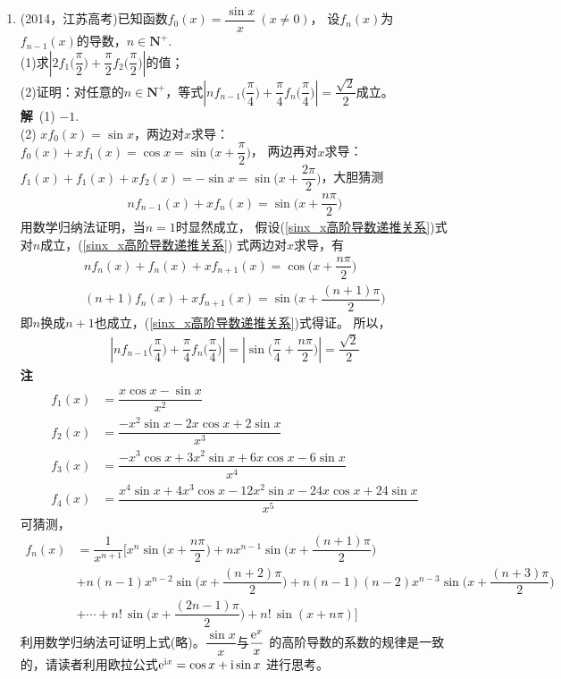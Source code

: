 \begin{enumerate}[label={【\textbf{例\thechapter.\arabic*}】},
 leftmargin=\inteval{\myenumleftmargin}pt,
 itemsep=\inteval{\myenumitempsep}pt,
 itemindent=\inteval{\myenumitemindent}pt]
\item (2014，江苏高考)已知函数$f_{0}(x)=\dfrac{\sin x}{x}\ (x\neq 0)$，
设$f_{n}(x)$为$f_{n-1}(x)$的导数，$n\in \textbf{N}^{+}$. \\
(1)求$ \left|2f_{1}\Big(\dfrac{\pi}{2}\Big)+
\dfrac{\pi}{2}f_{2}\Big(\dfrac{\pi}{2}\Big)\right| $的值；\\
(2)证明：对任意的$n\in \textbf{N}^{+}$，等式$\left|nf_{n-1}
\Big(\dfrac{\pi}{4}\Big)+\dfrac{\pi}{4}f_{n}
\Big(\dfrac{\pi}{4}\Big)\right|=\dfrac{\sqrt{2}}{2}$成立。\\
\textbf{解}\ (1) $ -1 $. \\
(2) $ xf_0(x)=\sin x $，两边对$ x $求导：$ f_0(x)+xf_1(x)=\cos x=
\sin\Big(x+\dfrac{\pi}{2}\Big) $，
两边再对$ x $求导：$ f_1(x)+f_1(x)+xf_2(x)=-\sin x=
\sin\Big(x+\dfrac{2\pi}{2}\Big) $，大胆猜测
\begin{gather}\label{sinx_x高阶导数递推关系}
    nf_{n-1}(x)+xf_{n}(x)=\sin\Big(x+\dfrac{n\pi}{2}\Big)
\end{gather}
用数学归纳法证明，当$ n=1 $时显然成立，
假设(\ref{sinx_x高阶导数递推关系})式对$ n $成立，(\ref{sinx_x高阶导数递推关系})
式两边对$ x $求导，有
\begin{gather*}
    nf_{n}(x)+f_n(x)+xf_{n+1}(x)=\cos\Big(x+\dfrac{n\pi}{2}\Big) \\
    (n+1)f_n(x)+xf_{n+1}(x)=\sin\Big(x+\dfrac{(n+1)\pi}{2}\Big)
\end{gather*}
即$ n $换成$ n+1 $也成立，(\ref{sinx_x高阶导数递推关系})式得证。
所以，
\begin{gather*}
    \left|nf_{n-1}\Big(\dfrac{\pi}{4}\Big)+\dfrac{\pi}{4}f_{n}
    \Big(\dfrac{\pi}{4}\Big)\right|=\left|\sin\Big(\dfrac{\pi}{4}
    +\dfrac{n\pi}{2}\Big)\right|=\dfrac{\sqrt{2}}{2}
\end{gather*}
\textbf{注}\ 
\begin{align*}
    f_1(x) &=\dfrac{x\cos x-\sin x}{x^2}  \\
    f_2(x) &=\dfrac{-x^{2}\sin x-2x\cos x+2\sin x}{x^3}  \\
    f_3(x) &=\dfrac{-x^{3}\cos x+3x^{2}\sin x+6x\cos x-6\sin x}{x^4}  \\
    f_4(x) &=\dfrac{x^{4}\sin x+4x^{3}\cos x-12x^{2}\sin x-24x\cos x+
        24\sin x}{x^5}
\end{align*}
可猜测，
\begin{align*}
    f_n(x) &=\dfrac{1}{x^{n+1}}\Bigg[x^{n}\sin \Big(x+\dfrac{n\pi}{2}\Big)+
    nx^{n-1}\sin \Big(x+\dfrac{(n+1)\pi}{2}\Big)  \\
    & + n(n-1)x^{n-2}\sin \Big(x+\dfrac{(n+2)\pi}{2}\Big)
    +n(n-1)(n-2)x^{n-3}\sin \Big(x+\dfrac{(n+3)\pi}{2}\Big)  \\
    & +\cdots +n!\,\sin\Big(x+\dfrac{(2n-1)\pi}{2}\Big)+
    n!\,\sin(x+n\pi)\Bigg]
\end{align*}
利用数学归纳法可证明上式(略)。$ \dfrac{\sin x}{x} $与$ \dfrac{\mathrm{e}^x}{x} $
的高阶导数的系数的规律是一致的，请读者利用欧拉公式$ \mathrm{e}^{\mathrm{i} x}=\cos x+\mathrm{i}\sin x $
进行思考。


\end{enumerate}
